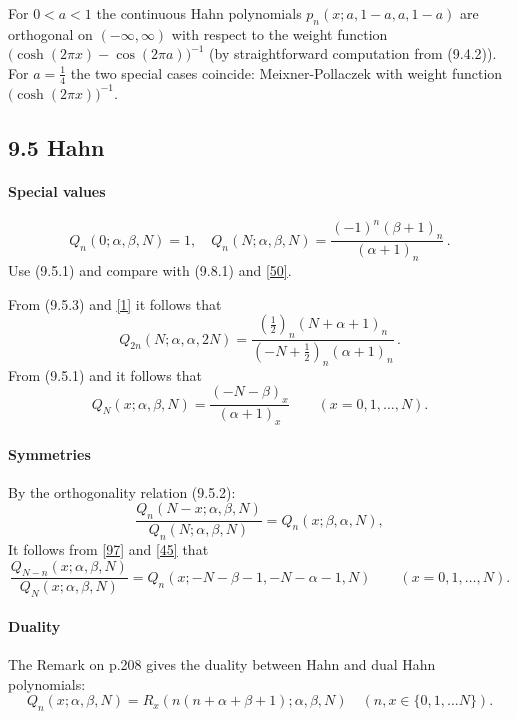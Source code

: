 \documentclass[twoside,11pt]{article}
\newcommand\al\alpha
\newcommand\be\beta
\newcommand\thalf{\tfrac12}
\newcommand\iy\infty
\begin{document}
For $0<a<1$ the continuous Hahn polynomials $p_n(x;a,1-a,a,1-a)$
are orthogonal on $(-\iy,\iy)$ with respect to the weight function
$\big(\cosh(2\pi x)-\cos(2\pi a)\big)^{-1}$
(by straightforward computation from (9.4.2)).
For $a=\tfrac14$ the two special cases coincide:
Meixner-Pollaczek with weight function $\big(\cosh(2\pi x)\big)^{-1}$.
%
\subsection*{9.5 Hahn}
\label{sec9.5}
%
\paragraph{Special values}
\begin{equation}
Q_n(0;\al,\be,N)=1,\quad
Q_n(N;\al,\be,N)=\frac{(-1)^n(\be+1)_n}{(\al+1)_n}\,.
\label{95}
\end{equation}
Use (9.5.1) and compare with (9.8.1) and \eqref{50}.

From (9.5.3) and \eqref{1} it follows that
\begin{equation}
Q_{2n}(N;\al,\al,2N)=\frac{(\thalf)_n(N+\al+1)_n}{(-N+\thalf)_n(\al+1)_n}\,.
\label{30}
\end{equation}
From (9.5.1) and  it follows that
\begin{equation}
Q_N(x;\al,\be,N)=\frac{(-N-\be)_x}{(\al+1)_x}\qquad(x=0,1,\ldots,N).
\label{44}
\end{equation}
%
\paragraph{Symmetries}
By the orthogonality relation (9.5.2):
\begin{equation}
\frac{Q_n(N-x;\al,\be,N)}{Q_n(N;\al,\be,N)}=Q_n(x;\be,\al,N),
\label{96}
\end{equation}
It follows from \eqref{97} and \eqref{45} that
\begin{equation}
\frac{Q_{N-n}(x;\al,\be,N)}{Q_N(x;\al,\be,N)}
=Q_n(x;-N-\be-1,-N-\al-1,N)
\qquad(x=0,1,\ldots,N).
\label{100}
\end{equation}
%
\paragraph{Duality}
The Remark on p.208 gives the duality between Hahn and dual Hahn polynomials:
%
\begin{equation}
Q_n(x;\al,\be,N)=R_x(n(n+\al+\be+1);\al,\be,N)\quad(n,x\in\{0,1,\ldots N\}).
\label{45}
\end{equation}
%
\end{document}

